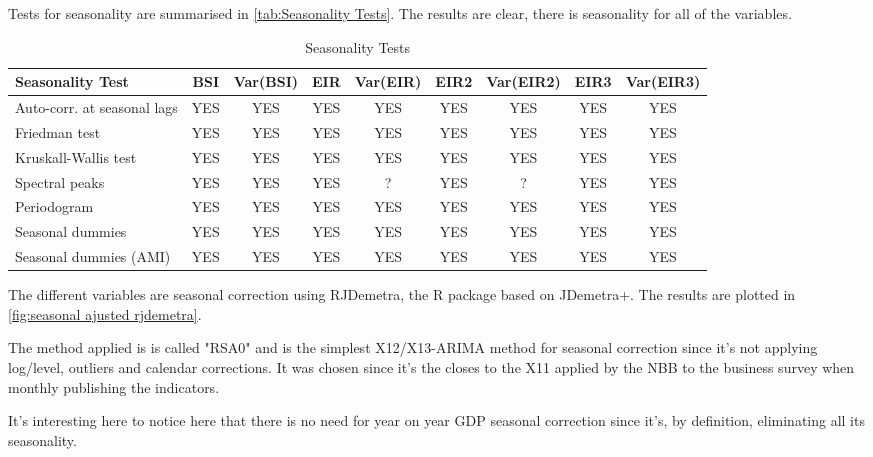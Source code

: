 \documentclass[12pt,a4paper,oneside]{book}
\begin{document}
Tests for seasonality are summarised in \autoref{tab:Seasonality Tests}. The results are clear, there is seasonality for all of the variables.

\begin{table}[htp!]
    \centering \footnotesize
    \begin{tabular}{l|c|c|c|c|c|c|c|c}
\textbf{Seasonality Test} & BSI & Var(BSI) & EIR & Var(EIR) & EIR2 & Var(EIR2) & EIR3 & Var(EIR3) \\ \hline
Auto-corr. at seasonal lags& YES & YES & YES & YES & YES & YES & YES & YES \\
Friedman test       & YES   & YES & YES & YES & YES & YES & YES & YES \\
Kruskall-Wallis test & YES   & YES & YES & YES & YES & YES & YES & YES \\
Spectral peaks                  & YES   & YES & YES & ? & YES & ? & YES & YES \\
Periodogram                     & YES   & YES & YES & YES & YES & YES & YES & YES \\
Seasonal dummies                & YES   & YES & YES & YES & YES & YES & YES & YES \\
Seasonal dummies (AMI)          & YES   & YES & YES & YES & YES & YES & YES & YES \\
    \end{tabular}
    \caption{Seasonality Tests}
    \label{tab:Seasonality Tests}
\end{table}



The different variables are seasonal correction using RJDemetra, the R package based on JDemetra+.
The results are plotted in \autoref{fig:seasonal ajusted rjdemetra}.

The method applied is is called "RSA0" and is the simplest X12/X13-ARIMA method for seasonal correction since it's not applying log/level, outliers and calendar corrections. 
It was chosen since it's the closes to the X11 applied by the NBB to the business survey when monthly publishing the indicators.

It's interesting here to notice here that there is no need for year on year GDP seasonal correction since  it's, by definition, eliminating all its seasonality.
\end{document}

